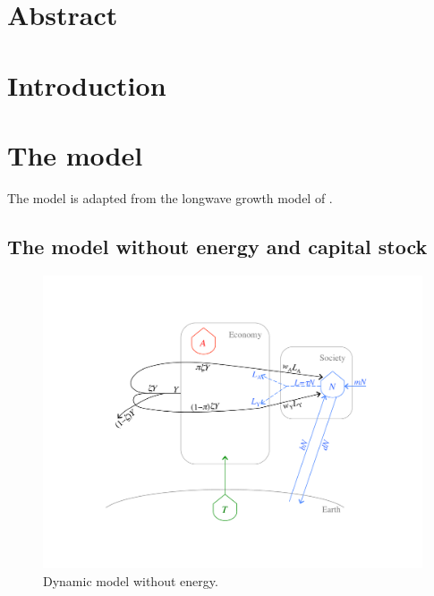 \documentclass[letterpaper,12pt]{article}
\begin{document}

\section*{Abstract}

\section{Introduction}

\section{The model}

The model is adapted from the longwave growth model of \citet{Jones:2001wn}.

\subsection{The model without energy and capital stock}

\begin{figure} \label{fig:ModelWithoutEnergy}
  \begin{center}
    \includegraphics[width=\textwidth]{figure_other/ModelWithoutEnergy.pdf}
    \caption{Dynamic model without energy.}
  \end{center}
\end{figure}
\end{document}
